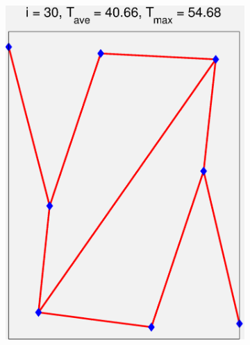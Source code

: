 \documentclass[11pt,letterpaper]{article}
\begin{document}
\begin{figure}[!h]
\begin{subfigure}{0.2\textwidth}
\includegraphics[width=\linewidth]{parallelTwo_Pmax30k_channel_30.eps}
\caption{}
\end{subfigure}


\end{figure}
\end{document}
